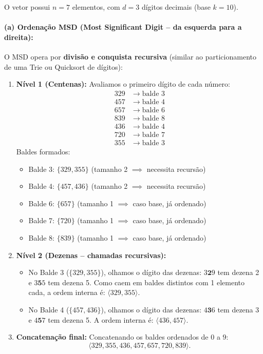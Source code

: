 \documentclass[11pt,a4paper]{article}
\begin{document}
O vetor possui $n = 7$ elementos, com $d = 3$ dígitos decimais (base $k = 10$).

\paragraph{(a) Ordenação MSD (Most Significant Digit -- da esquerda para a direita):}
O MSD opera por \textbf{divisão e conquista recursiva} (similar ao particionamento de uma Trie ou Quicksort de dígitos):
\begin{enumerate}
    \item \textbf{Nível 1 (Centenas):}
    Avaliamos o primeiro dígito de cada número:
    \begin{align*}
        329 &\rightarrow \text{balde } 3 \\
        457 &\rightarrow \text{balde } 4 \\
        657 &\rightarrow \text{balde } 6 \\
        839 &\rightarrow \text{balde } 8 \\
        436 &\rightarrow \text{balde } 4 \\
        720 &\rightarrow \text{balde } 7 \\
        355 &\rightarrow \text{balde } 3
    \end{align*}
    Baldes formados:
    \begin{itemize}
        \item Balde 3: $\{329, 355\}$ (tamanho 2 $\implies$ necessita recursão)
        \item Balde 4: $\{457, 436\}$ (tamanho 2 $\implies$ necessita recursão)
        \item Balde 6: $\{657\}$ (tamanho 1 $\implies$ caso base, já ordenado)
        \item Balde 7: $\{720\}$ (tamanho 1 $\implies$ caso base, já ordenado)
        \item Balde 8: $\{839\}$ (tamanho 1 $\implies$ caso base, já ordenado)
    \end{itemize}

    \item \textbf{Nível 2 (Dezenas -- chamadas recursivas):}
    \begin{itemize}
        \item No Balde 3 ($\{329, 355\}$), olhamos o dígito das dezenas:
        $3\mathbf{2}9$ tem dezena 2 e $3\mathbf{5}5$ tem dezena 5.
        Como caem em baldes distintos com 1 elemento cada, a ordem interna é: $\langle 329, 355 \rangle$.
        \item No Balde 4 ($\{457, 436\}$), olhamos o dígito das dezenas:
        $4\mathbf{3}6$ tem dezena 3 e $4\mathbf{5}7$ tem dezena 5.
        A ordem interna é: $\langle 436, 457 \rangle$.
    \end{itemize}

    \item \textbf{Concatenação final:}
    Concatenando os baldes ordenados de $0$ a $9$:
    \[
        \langle 329, 355, 436, 457, 657, 720, 839 \rangle.
    \]
\end{enumerate}
\end{document}

